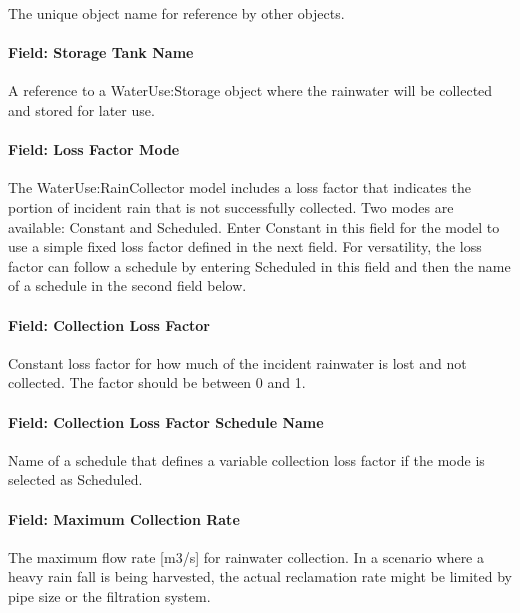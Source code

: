 The unique object name for reference by other objects.

\paragraph{Field: Storage Tank Name}\label{field-storage-tank-name}

A reference to a WaterUse:Storage object where the rainwater will be collected and stored for later use.

\paragraph{Field: Loss Factor Mode}\label{field-loss-factor-mode}

The WaterUse:RainCollector model includes a loss factor that indicates the portion of incident rain that is not successfully collected. Two modes are available: Constant and Scheduled. Enter Constant in this field for the model to use a simple fixed loss factor defined in the next field. For versatility, the loss factor can follow a schedule by entering Scheduled in this field and then the name of a schedule in the second field below.

\paragraph{Field: Collection Loss Factor}\label{field-collection-loss-factor}

Constant loss factor for how much of the incident rainwater is lost and not collected. The factor should be between 0 and 1.

\paragraph{Field: Collection Loss Factor Schedule Name}\label{field-collection-loss-factor-schedule-name}

Name of a schedule that defines a variable collection loss factor if the mode is selected as Scheduled.

\paragraph{Field: Maximum Collection Rate}\label{field-maximum-collection-rate}

The maximum flow rate {[}m3/s{]} for rainwater collection. In a scenario where a heavy rain fall is being harvested, the actual reclamation rate might be limited by pipe size or the filtration system.

